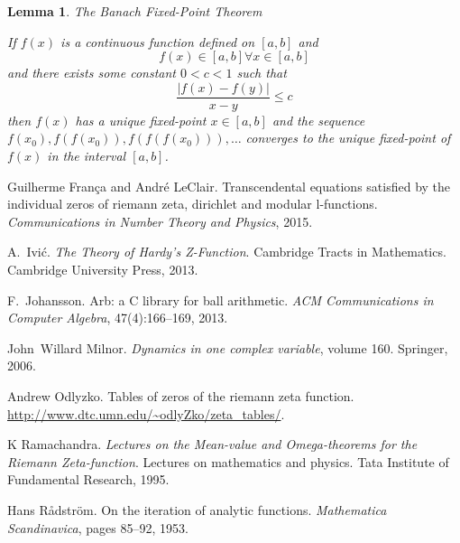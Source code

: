 \documentclass{article}
\newcommand{\tmtextit}[1]{{\itshape{#1}}}
\newtheorem{lemma}{Lemma}
{\theorembodyfont{\rmfamily}\newtheorem{note}{Note}}
\begin{document}
\begin{lemma}
  The Banach Fixed-Point Theorem
  
  If $f (x)$ is a continuous function defined on $[a, b]$ and
  \begin{equation}
    f (x) \in [a, b] \forall x \in [a, b]
  \end{equation}
  and there exists some constant $0 < c < 1$ such that
  \begin{equation}
    \text{$\frac{| f (x) - f (y) |}{x - y} \leqslant c$} \label{lc}
  \end{equation}
  then $f (x)$ has a unique fixed-point $x \in [a, b]$ and the sequence $f
  (x_0), f (f (x_0)), f (f (f (x_0))), \ldots$ converges to the unique
  fixed-point of $f (x)$ in the interval $[a, b]$.
\end{lemma}

\begin{thebibliography}{1}
  Guilherme Fran{\c c}a  and  Andr{\'e} LeClair.{\newblock}
  Transcendental equations satisfied by the individual zeros of riemann
  zeta, dirichlet and modular l-functions.{\newblock}
  \tmtextit{Communications in Number Theory and Physics}, 2015.{\newblock}
  
  A.~Ivi{\'c}.{\newblock} \tmtextit{The Theory of Hardy's
  Z-Function}.{\newblock} Cambridge Tracts in Mathematics. Cambridge
  University Press, 2013.{\newblock}
  
  F.~Johansson.{\newblock} Arb: a C library for
  ball arithmetic.{\newblock} \tmtextit{ACM Communications in Computer
  Algebra}, 47(4):166--169, 2013.{\newblock}
  
  John~Willard Milnor.{\newblock}
  \tmtextit{Dynamics in one complex variable},  volume  160.{\newblock}
  Springer, 2006.{\newblock}
  
  Andrew Odlyzko.{\newblock} Tables of zeros of the riemann
  zeta function.{\newblock}
  \url{http://www.dtc.umn.edu/~odlyZko/zeta_tables/}.{\newblock}
  
  K Ramachandra.{\newblock}
  \tmtextit{Lectures on the Mean-value and Omega-theorems for the Riemann
  Zeta-function}.{\newblock} Lectures on mathematics and physics. Tata
  Institute of Fundamental Research, 1995.{\newblock}
  
  Hans R{\r a}dstr{\"o}m.{\newblock} On the
  iteration of analytic functions.{\newblock} \tmtextit{Mathematica
  Scandinavica},  pages  85--92, 1953.{\newblock}
\end{thebibliography}
\end{document}
